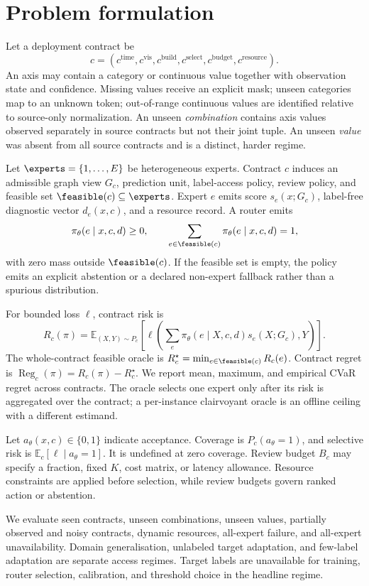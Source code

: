 \section{Problem formulation}



Let a deployment contract be
\[
c=(c^{\mathrm{time}},c^{\mathrm{vis}},c^{\mathrm{build}},c^{\mathrm{select}},c^{\mathrm{budget}},c^{\mathrm{resource}}).
\]
An axis may contain a category or continuous value together with observation state and confidence. Missing values receive an explicit mask; unseen categories map to an unknown token; out-of-range continuous values are identified relative to source-only normalization. An unseen \emph{combination} contains axis values observed separately in source contracts but not their joint tuple. An unseen \emph{value} was absent from all source contracts and is a distinct, harder regime.

Let \(\experts=\{1,\ldots,E\}\) be heterogeneous experts. Contract \(c\) induces an admissible graph view \(G_c\), prediction unit, label-access policy, review policy, and feasible set \(\feasible(c)\subseteq\experts\). Expert \(e\) emits score \(s_e(x;G_c)\), label-free diagnostic vector \(d_e(x,c)\), and a resource record. A router emits
\[
\pi_\theta(e\mid x,c,d)\geq 0,\qquad
\sum_{e\in\feasible(c)}\pi_\theta(e\mid x,c,d)=1,
\]
with zero mass outside \(\feasible(c)\). If the feasible set is empty, the policy emits an explicit abstention or a declared non-expert fallback rather than a spurious distribution.

For bounded loss \(\ell\), contract risk is
\[
R_c(\pi)=\mathbb E_{(X,Y)\sim P_c}\!\left[\ell\!\left(\sum_e\pi_\theta(e\mid X,c,d)s_e(X;G_c),Y\right)\right].
\]
The whole-contract feasible oracle is \(R_c^\star=\min_{e\in\feasible(c)}R_c(e)\). Contract regret is \(\operatorname{Reg}_c(\pi)=R_c(\pi)-R_c^\star\). We report mean, maximum, and empirical CVaR regret across contracts. The oracle selects one expert only after its risk is aggregated over the contract; a per-instance clairvoyant oracle is an offline ceiling with a different estimand.

Let \(a_\theta(x,c)\in\{0,1\}\) indicate acceptance. Coverage is \(P_c(a_\theta=1)\), and selective risk is \(\mathbb E_c[\ell\mid a_\theta=1]\). It is undefined at zero coverage. Review budget \(B_c\) may specify a fraction, fixed \(K\), cost matrix, or latency allowance. Resource constraints are applied before selection, while review budgets govern ranked action or abstention.

We evaluate seen contracts, unseen combinations, unseen values, partially observed and noisy contracts, dynamic resources, all-expert failure, and all-expert unavailability. Domain generalisation, unlabeled target adaptation, and few-label adaptation are separate access regimes. Target labels are unavailable for training, router selection, calibration, and threshold choice in the headline regime.
